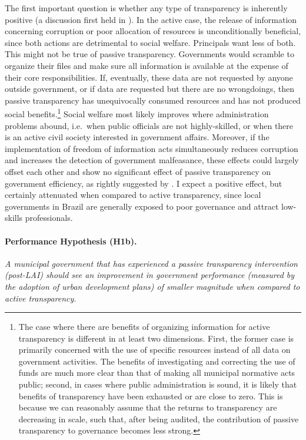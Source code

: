 \documentclass[11pt]{article}
\begin{document}
The first important question is whether any type of transparency is inherently positive (a discussion first held in \citet{PratWrongKindTransparency2005}). In the active case, the release of information concerning corruption or poor allocation of resources is unconditionally beneficial, since both actions are detrimental to social welfare. Principals want less of both. This might not be true of passive transparency. Governments would scramble to organize their files and make sure all information is available at the expense of their core responsibilities. If, eventually, these data are not requested by anyone outside government, or if data are requested but there are no wrongdoings, then passive transparency has unequivocally consumed resources and has not produced social benefits.\footnote{The case where there are benefits of organizing information for active transparency is different in at least two dimensions. First, the former case is primarily concerned with the use of specific resources instead of all data on government activities. The benefits of investigating and correcting the use of funds are much more clear than that of making all municipal normative acts public; second, in cases where public administration is sound, it is likely that benefits of transparency have been exhausted or are close to zero. This is because we can reasonably assume that the returns to transparency are decreasing in scale, such that, after being audited, the contribution of passive transparency to governance becomes less strong.} Social welfare most likely improves where administration problems abound, i.e.~when public officials are not highly-skilled, or when there is an active civil society interested in government affairs. Moreover, if the implementation of freedom of information acts simultaneously reduces corruption and increases the detection of government malfeasance, these effects could largely offset each other and show no significant effect of passive transparency on government efficiency, as rightly suggested by \citet{CordisSunshineDisinfectantEffect2014}. I expect a positive effect, but certainly attenuated when compared to active transparency, since local governments in Brazil are generally exposed to poor governance and attract low-skills professionals.

\paragraph{Performance Hypothesis (H1b).} \emph{A municipal government that has experienced a passive transparency intervention (post-LAI) should see an improvement in government performance (measured by the adoption of urban development plans) of smaller magnitude when compared to active transparency.}\\
\end{document}
